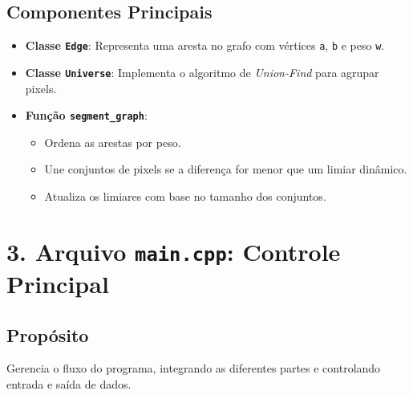 \documentclass[12pt]{article}
\begin{document}
\subsection*{Componentes Principais}
\begin{itemize}
    \item \textbf{Classe \texttt{Edge}}: Representa uma aresta no grafo com vértices \texttt{a}, \texttt{b} e peso \texttt{w}.
    \item \textbf{Classe \texttt{Universe}}: Implementa o algoritmo de \textit{Union-Find} para agrupar pixels.
    \item \textbf{Função \texttt{segment\_graph}}:
    \begin{itemize}
        \item Ordena as arestas por peso.
        \item Une conjuntos de pixels se a diferença for menor que um limiar dinâmico.
        \item Atualiza os limiares com base no tamanho dos conjuntos.
    \end{itemize}
\end{itemize}

\section*{3. Arquivo \texttt{main.cpp}: Controle Principal}
\subsection*{Propósito}
Gerencia o fluxo do programa, integrando as diferentes partes e controlando entrada e saída de dados.
\end{document}
